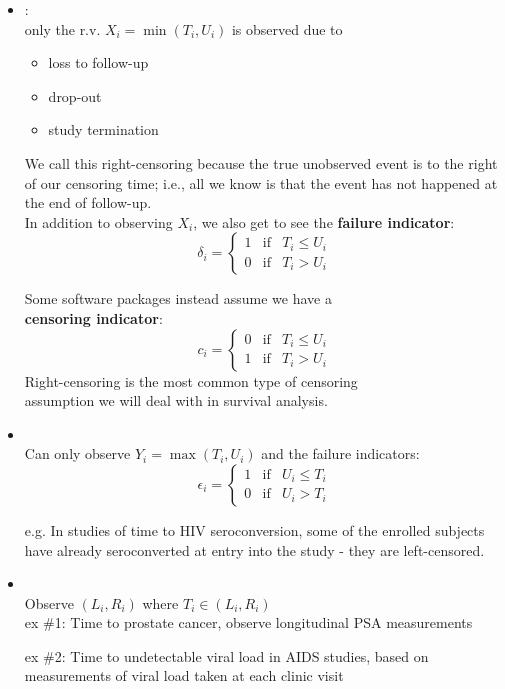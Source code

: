 \documentclass[11pt,slidesonly,semrot,portrait,palatino]{book}
\begin{document}
\begin{itemize}
\item {}:\\[3ex]
only the r.v. $X_i=\min(T_i,U_i)$ is observed due to
\begin{itemize}
\item loss to follow-up
\item drop-out
\item study termination
\end{itemize}

We call this right-censoring because the true unobserved event
is to the right of our censoring time; i.e., all we know is
that the event has not happened at the end of follow-up.
\\[2ex]
In addition to observing $X_i$, we also get to see the {\bf failure indicator}:
\[\delta_i=\left\{\begin{array}{ccc}
1 & \mbox{if} & T_i\le U_i \\
0 & \mbox{if} & T_i>U_i \end{array} \right. \]

Some software packages instead assume we have a \\
{\bf censoring indicator}:
\[c_i=\left\{\begin{array}{ccc}
0 & \mbox{if} & T_i\le U_i \\
1 & \mbox{if} & T_i>U_i \end{array} \right. \]
Right-censoring is the most common type of censoring \\
assumption we will deal with in survival analysis.
\item {}\\[3ex]
Can only observe $Y_i=\max(T_i,U_i)$ and the failure indicators:
\[\epsilon_i=\left\{\begin{array}{ccc}
1 & \mbox{if} & U_i\le T_i \\
0 & \mbox{if} & U_i>T_i \end{array} \right. \]

e.g. In studies of time to HIV seroconversion, some of the enrolled
subjects have already seroconverted at entry into the study - they are
left-censored.
\item  {}\\[3ex]
Observe $(L_i,R_i)$ where  $T_i\in (L_i,R_i)$\\

ex \#1: Time to prostate cancer, observe longitudinal PSA measurements

ex \#2: Time to undetectable viral load in AIDS studies, based on
measurements of viral load taken at each clinic visit
\end{itemize}
\end{document}
